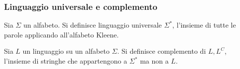\documentclass{subfiles}
\begin{document}
\subsubsection{Linguaggio universale e complemento}
\begin{Definition*}
    Sia \(\Sigma\) un alfabeto. Si definisce linguaggio universale \(\Sigma^{*}\), l'insieme di tutte le parole applicando all'alfabeto Kleene.
\end{Definition*}
\begin{Definition*}
    Sia \(L\) un linguaggio su un alfabeto \(\Sigma\). Si definisce complemento di \(L, L^{C}\), l'insieme di stringhe che appartengono a \(\Sigma^{*}\) ma non a \(L\).
\end{Definition*}
\end{document}
